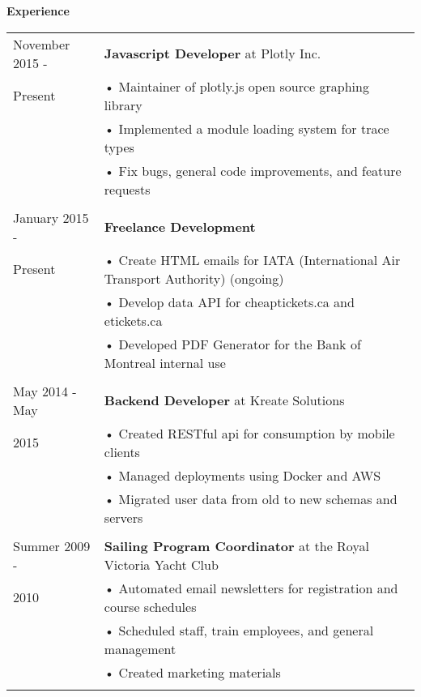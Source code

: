 \documentclass[notitlepage,oneside,draft]{article}
\begin{document}
\begin{flushleft}
  \large
  \textbf{Experience} \\
  \vspace{12pt}
  \normalsize
  \begin{tabular}{ p{86pt} | l}
    November 2015 - & \textbf{Javascript Developer} at Plotly Inc. \\
    Present & • Maintainer of plotly.js open source graphing library \\
    & • Implemented a module loading system for trace types \\
    & • Fix bugs, general code improvements, and feature requests \\
    & \\
    January 2015 - & \textbf{Freelance Development} \\
    Present & • Create HTML emails for IATA (International Air Transport Authority) (ongoing) \\
    & • Develop data API for cheaptickets.ca and etickets.ca \\
    & • Developed PDF Generator for the Bank of Montreal internal use \\
    & \\
    May 2014 - May & \textbf{Backend Developer} at Kreate Solutions \\
    2015 & • Created RESTful api for consumption by mobile clients \\
    & • Managed deployments using Docker and AWS \\
    & • Migrated user data from old to new schemas and servers \\
    & \\
    Summer 2009 - & \textbf{Sailing Program Coordinator} at the Royal Victoria Yacht Club \\
    2010 & • Automated email newsletters for registration and course schedules \\
    & • Scheduled staff, train employees, and general management \\
    & • Created marketing materials \\
    & \\
  \end{tabular}
  \vspace{24pt}



\end{flushleft}
\end{document}
